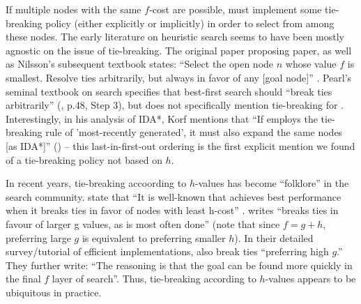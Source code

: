 If multiple nodes with the same $f$-cost are possible, \astar
must implement some tie-breaking policy (either
explicitly or implicitly) in order to select from among these nodes.
The early literature on heuristic search seems to have been mostly agnostic on the issue of tie-breaking.
The original paper proposing \astar paper, as well as Nilsson's
subsequent textbook states: ``Select the open node $n$ whose value $f$
is smallest. Resolve ties arbitrarily, but always in favor of any [goal
node]'' \cite[p.102 Step 2]{hart1968formal} \cite[p.69]{Nilsson71}.
Pearl's seminal textbook on search specifies that best-first search should ``break ties arbitrarily'' (\citeyear{pearl1984heuristics}, p.48, Step 3), but does not specifically mention tie-breaking for \astar.
Interestingly, in his analysis of IDA*, Korf mentions that ``If \astar employs the tie-breaking rule of 'most-recently generated', it must also expand the same nodes [as IDA*]'' (\citeyear{korf1985depth}) -- this last-in-first-out ordering is the first explicit mention we found of a tie-breaking policy not based on $h$.

In recent years, tie-breaking accoording to $h$-values has become ``folklore'' in the search community.
\citeauthor{hansen2007anytime} state that ``It is well-known 
that \astar achieves best performance when it breaks ties
in favor of nodes with least h-cost'' \cite{hansen2007anytime}.
\citeauthor{holte2010common} writes ``\astar breaks ties in favour
of larger g values, as is most often done'' (note that since $f=g+h$, preferring large $g$ is equivalent to preferring smaller $h$).
In their detailed survey/tutorial of efficient \astar implementations, \citeauthor{burns2012implementing} also break ties ``preferring high
$g$.'' They further write: ``The reasoning is that the goal can be found more quickly in the final $f$ layer of search''. 
Thus, tie-breaking according to $h$-values appears to be ubiquitous in practice.


